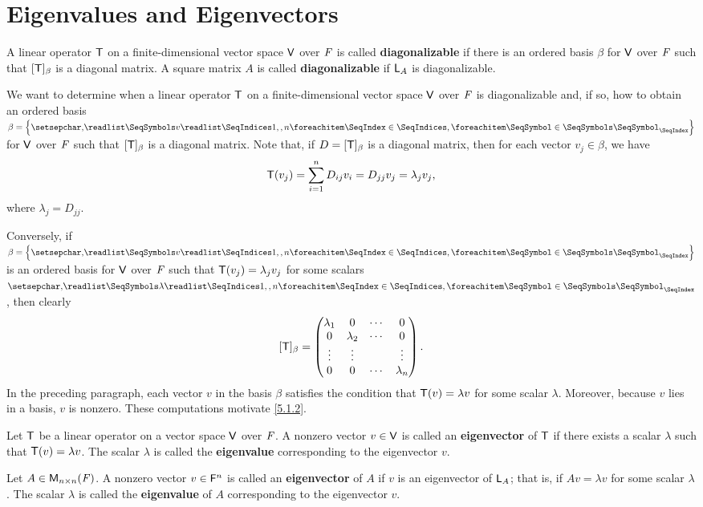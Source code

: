 \section{Eigenvalues and Eigenvectors}\label{sec:5.1}

\begin{defn}\label{5.1.1}
	A linear operator \(\mathsf{T}\) on a finite-dimensional vector space \(\mathsf{V}\) over \(\mathit{F}\) is called \textbf{diagonalizable} if there is an ordered basis \(\beta\) for \(\mathsf{V}\) over \(\mathit{F}\) such that \([\mathsf{T}]_{\beta}\) is a diagonal matrix.
	A square matrix \(A\) is called \textbf{diagonalizable} if \(\mathsf{L}_A\) is diagonalizable.
\end{defn}

\begin{note}
	We want to determine when a linear operator \(\mathsf{T}\) on a finite-dimensional vector space \(\mathsf{V}\) over \(\mathit{F}\) is diagonalizable and, if so, how to obtain an ordered basis \(\beta = \set{\seq{v}{1,,n}}\) for \(\mathsf{V}\) over \(\mathit{F}\) such that \([\mathsf{T}]_{\beta}\) is a diagonal matrix.
	Note that, if \(D = [\mathsf{T}]_{\beta}\) is a diagonal matrix, then for each vector \(v_j \in \beta\), we have
	\[
		\mathsf{T}(v_j) = \sum_{i = 1}^n D_{i j} v_i = D_{j j} v_j = \lambda_j v_j,
	\]
	where \(\lambda_j = D_{j j}\).

	Conversely, if \(\beta = \set{\seq{v}{1,,n}}\) is an ordered basis for \(\mathsf{V}\) over \(\mathit{F}\) such that \(\mathsf{T}(v_j) = \lambda_j v_j\) for some scalars \(\seq{\lambda}{1,,n}\), then clearly
	\[
		[\mathsf{T}]_{\beta} = \begin{pmatrix}
			\lambda_1 & 0         & \cdots & 0         \\
			0         & \lambda_2 & \cdots & 0         \\
			\vdots    & \vdots    &        & \vdots    \\
			0         & 0         & \cdots & \lambda_n
		\end{pmatrix}.
	\]
	In the preceding paragraph, each vector \(v\) in the basis \(\beta\) satisfies the condition that \(\mathsf{T}(v) = \lambda v\) for some scalar \(\lambda\).
	Moreover, because \(v\) lies in a basis, \(v\) is nonzero.
	These computations motivate \cref{5.1.2}.
\end{note}

\begin{defn}\label{5.1.2}
	Let \(\mathsf{T}\) be a linear operator on a vector space \(\mathsf{V}\) over \(\mathit{F}\).
	A nonzero vector \(v \in \mathsf{V}\) is called an \textbf{eigenvector} of \(\mathsf{T}\) if there exists a scalar \(\lambda\) such that \(\mathsf{T}(v) = \lambda v\).
	The scalar \(\lambda\) is called the \textbf{eigenvalue} corresponding to the eigenvector \(v\).

	Let \(A \in \ms[n][n][\F]\).
	A nonzero vector \(v \in \mathsf{F}^n\) is called an \textbf{eigenvector} of \(A\) if \(v\) is an eigenvector of \(\mathsf{L}_A\);
	that is, if \(Av = \lambda v\) for some scalar \(\lambda\).
	The scalar \(\lambda\) is called the \textbf{eigenvalue} of \(A\) corresponding to the eigenvector \(v\).
\end{defn}

